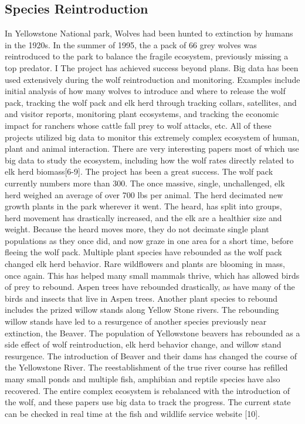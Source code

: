 \documentclass[sigconf]{acmart}
\begin{document}
\subsection{Species Reintroduction}
In Yellowstone National park, Wolves had been hunted to extinction by humans in the 1920s.  In the summer of 1995, the a pack of 66 grey wolves was reintroduced to the park to balance the fragile ecosystem, previously missing a top predator.  I The project has achieved success beyond plans.  Big data has been used extensively during the wolf reintroduction and monitoring.  Examples include initial analysis of how many wolves to introduce and where to release the wolf pack, tracking the wolf pack and elk herd through tracking collars, satellites, and and visitor reports, monitoring plant ecosystems, and tracking the economic impact for ranchers whose cattle fall prey to wolf attacks, etc.    All of these projects utilized big data to monitor this extremely complex ecosystem of human, plant and animal interaction. There are very interesting papers most of which use big data to study the ecosystem, including how the wolf rates directly related to elk herd biomass[6-9].  
The project has been a great success.  The wolf pack currently numbers more than 300.  The once massive, single, unchallenged, elk herd weighed an average of over 700 lbs per animal.  The herd decimated new growth plants in the park wherever it went.  The heard, has split into groups, herd movement has drastically increased, and the elk are a healthier size and weight. Because the heard moves more, they do not decimate single plant populations as they once did, and now graze in one area for a short time, before fleeing the wolf pack.  Multiple plant species have rebounded as the wolf pack changed elk herd behavior.  Rare wildflowers and plants are blooming in mass, once again.  This has helped many small mammals thrive, which has allowed birds of prey to rebound.  
Aspen trees have rebounded drastically, as have many of the birds and insects that live in Aspen trees.  Another plant species to rebound includes the prized willow stands along Yellow Stone rivers.  The rebounding willow stands have led to a resurgence of another species previously near extinction, the Beaver.  The population of Yellowstone beavers has rebounded as a side effect of wolf reintroduction, elk herd behavior change, and willow stand resurgence. The introduction of Beaver and their dams has changed the course of the Yellowstone River.  The reestablishment of the true river course has refilled many small ponds and multiple fish, amphibian and reptile species have also recovered. 
The entire complex ecosystem is rebalanced with the introduction of the wolf, and these papers use big data to track the progress.  The current state can be checked in real time at the fish and wildlife service website [10].    
\end{document}
